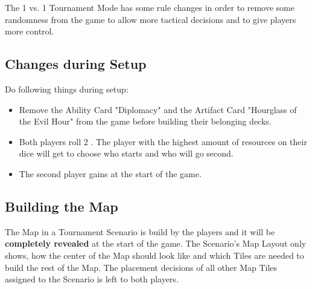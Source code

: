 
\begin{multicols*}{2}

The 1 vs. 1 Tournament Mode has some rule changes in order to remove some randomness from the game to allow more tactical decisions and to give players more control.

\subsection*{Changes during Setup}

Do following things during setup:
\begin{itemize}
    \item Remove the Ability Card "Diplomacy" and the Artifact Card "Hourglass of the Evil Hour" from the game before building their belonging decks.
    \item Both players roll 2 . The player with the highest amount of resources on their dice will get to choose who starts and who will go second.
    \item The second player gains  at the start of the game.
\end{itemize}


\subsection*{Building the Map}

The Map in a Tournament Scenario is build by the players and it will be \textbf{completely revealed} at the start of the game.
The Scenario's Map Layout only shows, how the center of the Map should look like and which Tiles are needed to build the rest of the Map.
The placement decisions of all other Map Tiles assigned to the Scenario is left to both players.\par


\end{multicols*}
